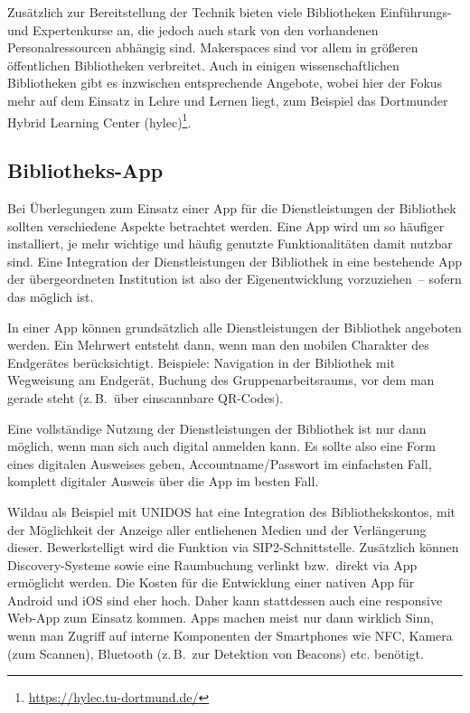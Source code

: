 \documentclass[
  11pt,
  letterpaper,
  DIV=11,
  twoside]{scrreprt}
\DeclareRobustCommand{\href}[2]{#2\footnote{\url{#1}}}
\begin{document}
Zusätzlich zur Bereitstellung der Technik bieten viele Bibliotheken
Einführungs- und Expertenkurse an, die jedoch auch stark von den
vorhandenen Personalressourcen abhängig sind. Makerspaces sind vor allem
in größeren öffentlichen Bibliotheken verbreitet. Auch in einigen
wissenschaftlichen Bibliotheken gibt es inzwischen entsprechende
Angebote, wobei hier der Fokus mehr auf dem Einsatz in Lehre und Lernen
liegt, zum Beispiel das Dortmunder
\href{https://hylec.tu-dortmund.de/}{Hybrid Learning Center (hylec)}.

\subsection{Bibliotheks-App}\label{bibliotheks-app}

Bei Überlegungen zum Einsatz einer App für die Dienstleistungen der
Bibliothek sollten verschiedene Aspekte betrachtet werden. Eine App wird
um so häufiger installiert, je mehr wichtige und häufig genutzte
Funktionalitäten damit nutzbar sind. Eine Integration der
Dienstleistungen der Bibliothek in eine bestehende App der
übergeordneten Institution ist also der Eigenentwicklung vorzuziehen~--
sofern das möglich ist.

In einer App können grundsätzlich alle Dienstleistungen der Bibliothek
angeboten werden. Ein Mehrwert entsteht dann, wenn man den mobilen
Charakter des Endgerätes berücksichtigt. Beispiele: Navigation in der
Bibliothek mit Wegweisung am Endgerät, Buchung des Gruppenarbeitsraums,
vor dem man gerade steht (z.\,B.~über einscannbare QR-Codes).

Eine vollständige Nutzung der Dienstleistungen der Bibliothek ist nur
dann möglich, wenn man sich auch digital anmelden kann. Es sollte also
eine Form eines digitalen Ausweises geben, Accountname/Passwort im
einfachsten Fall, komplett digitaler Ausweis über die App im besten
Fall.

Wildau als Beispiel mit UNIDOS hat eine Integration des
Bibliothekskontos, mit der Möglichkeit der Anzeige aller entliehenen
Medien und der Verlängerung dieser. Bewerkstelligt wird die Funktion via
SIP2-Schnittstelle. Zusätzlich können Discovery-Systeme sowie eine
Raumbuchung verlinkt bzw.~direkt via App ermöglicht werden. Die Kosten
für die Entwicklung einer nativen App für Android und iOS sind eher
hoch. Daher kann stattdessen auch eine responsive Web-App zum Einsatz
kommen. Apps machen meist nur dann wirklich Sinn, wenn man Zugriff auf
interne Komponenten der Smartphones wie NFC, Kamera (zum Scannen),
Bluetooth (z.\,B.~zur Detektion von Beacons) etc. benötigt.
\end{document}
